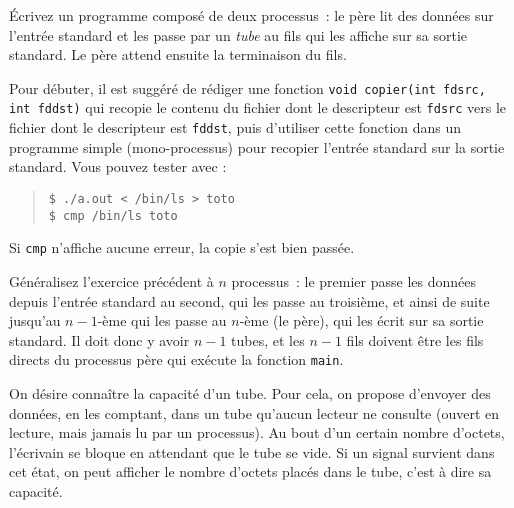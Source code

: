%


% 


\question
    \label {q:tube1}

Écrivez un programme composé de deux processus~: le père lit des
données sur l'entrée standard et les passe par un {\em tube} au fils
qui les affiche sur sa sortie standard. Le père attend ensuite la
terminaison du fils.

Pour débuter, il est suggéré de rédiger une fonction \texttt{void
copier(int fdsrc, int fddst)} qui recopie le contenu du fichier dont
le descripteur est \texttt{fdsrc} vers le fichier dont le descripteur
est \texttt{fddst}, puis d'utiliser cette fonction dans un programme
simple (mono-processus) pour recopier l'entrée standard sur la sortie
standard. Vous pouvez tester avec :

\begin {quote}
\begin {verbatim}
$ ./a.out < /bin/ls > toto
$ cmp /bin/ls toto
\end{verbatim}
\end {quote}

Si \texttt{cmp} n'affiche aucune erreur, la copie s'est bien passée.


\question

Généralisez l'exercice précédent à $n$ processus~:  le premier passe les
données depuis l'entrée standard au second, qui les passe au troisième,
et ainsi de suite jusqu'au $n-1$-ème qui les passe au $n$-ème (le père),
qui les écrit sur sa sortie standard. Il doit donc y avoir $n-1$ tubes,
et les $n-1$ fils doivent être les fils directs du processus père qui
exécute la fonction \texttt{main}.


\question

On désire connaître la capacité d'un tube.  Pour cela, on propose
d'envoyer des données, en les comptant, dans un tube qu'aucun lecteur ne
consulte (ouvert en lecture, mais jamais lu par un processus).  Au bout
d'un certain nombre d'octets, l'écrivain se bloque en attendant que le
tube se vide.  Si un signal survient dans cet état, on peut afficher le
nombre d'octets placés dans le tube, c'est à dire sa capacité.

